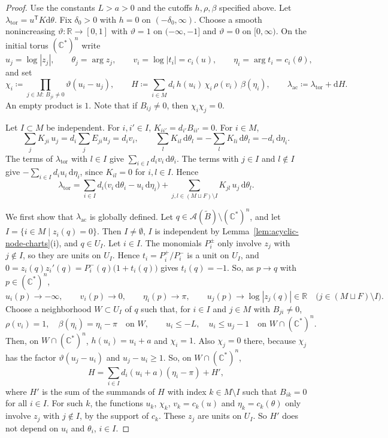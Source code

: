 \documentclass[11pt,a4paper]{article}
\newcommand{\cA}{\mathcal A}\newcommand{\sA}{\mathcal A}
\newcommand{\bC}{\mathbb C}\newcommand{\bR}{\mathbb R}\newcommand{\bZ}{\mathbb Z}
\newcommand{\dd}{\mathrm d}\newcommand{\T}{\mathsf T}
\newcommand{\ltor}{\lambda_{\mathrm{tor}}}
\begin{document}
\begin{proof}

Use the constants $L>a>0$ and the cutoffs $h,\rho,\beta$ specified above. Let \(\lambda_{\mathrm{tor}} = u^\T K \dd \theta \). 
Fix $\delta_0>0$ with $h=0$ on $(-\delta_0,\infty)$.
Choose a smooth nonincreasing $\vartheta\colon\bR\to[0,1]$ with $\vartheta=1$ on $(-\infty,-1]$ and $\vartheta=0$ on $[0,\infty)$.
On the initial torus $(\bC^*)^{n}$ write
\[
 u_j=\log|z_j|,\qquad \theta_j=\arg z_j,\qquad
 v_i=\log|t_i|=c_i(u),\qquad \eta_i=\arg t_i=c_i(\theta),
\]
and set
\[
 \chi_i \coloneqq \prod_{j\in M:\,B_{ji}\ne0}\vartheta(u_i-u_j),\qquad
 H \coloneqq \sum_{i\in M}d_i\,h(u_i)\,\chi_i\,\rho(v_i)\,\beta(\eta_i),\qquad
 \lambda_{\mathrm{ac}} \coloneqq\ltor+\dd H .
\]
An empty product is $1$. Note that 
if $B_{ij}\ne0$, then $\chi_i\chi_j=0$.


Let $I\subset M$ be independent.
For $i,i'\in I$, $K_{ii'}=d_{i'}B_{ii'}=0$.
For $i\in M$,
\[
 \sum_{j}K_{ji}\,u_j=d_i\sum_jE_{ji}u_j=d_iv_i,\qquad
 \sum_lK_{il}\,\dd\theta_l=-\sum_lK_{li}\,\dd\theta_l=-d_i\,\dd\eta_i .
\]
The terms of $\ltor$ with $l\in I$ give $\sum_{i\in I}d_iv_i\,\dd\theta_i$.
The terms with $j\in I$ and $l\notin I$ give $-\sum_{i\in I}d_iu_i\,\dd\eta_i$, since $K_{il}=0$ for $i,l\in I$.
Hence
\begin{equation}\label{eq:acyclic-ltor-split}
 \ltor=\sum_{i\in I}d_i\bigl(v_i\,\dd\theta_i-u_i\,\dd\eta_i\bigr)+\sum_{j,l\in(M\sqcup F)\setminus I}K_{jl}\,u_j\,\dd\theta_l .
\end{equation}

We first show that $\lambda_{\mathrm{ac}}$ is globally defined.
Let $q\in\cA(\widetilde B)\setminus(\bC^*)^{n}$, and let $I=\{i\in M\mid z_i(q)=0\}$.
Then $I\ne\emptyset$, $I$ is independent by Lemma~\ref{lem:acyclic-node-charts}(i), and $q\in U_I$.
Let $i\in I$.
The monomials $P_i^\pm$ only involve $z_j$ with $j\notin I$, so they are units on $U_I$.
Hence $t_i=P_i^+/P_i^-$ is a unit on $U_I$, and $0=z_i(q)z_i'(q)=P_i^-(q)\bigl(1+t_i(q)\bigr)$ gives $t_i(q)=-1$.
So, as $p\to q$ with $p\in(\bC^*)^{n}$,
\[
 u_i(p)\to-\infty,\qquad v_i(p)\to0,\qquad \eta_i(p)\to\pi,\qquad u_j(p)\to\log|z_j(q)|\in\bR\quad\bigl(j\in(M\sqcup F)\setminus I\bigr).
\]
Choose a neighborhood $W\subset U_I$ of $q$ such that, for $i\in I$ and $j\in M$ with $B_{ji}\ne0$,
\[
 \rho(v_i)=1,\quad \beta(\eta_i)=\eta_i-\pi\quad\text{on }W,\qquad
 u_i\le-L,\quad u_i\le u_j-1\quad\text{on }W\cap(\bC^*)^{n}.
\]
Then, on $W\cap(\bC^*)^{n}$, $h(u_i)=u_i+a$ and $\chi_i=1$.
Also $\chi_j=0$ there, because $\chi_j$ has the factor $\vartheta(u_j-u_i)$ and $u_j-u_i\ge1$.
So, on $W\cap(\bC^*)^{n}$,
\begin{equation}\label{eq:acyclic-H-near}
 H=\sum_{i\in I}d_i(u_i+a)(\eta_i-\pi)+H',
\end{equation}
where $H'$ is the sum of the summands of $H$ with index $k\in M\setminus I$ such that $B_{ik}=0$ for all $i\in I$.
For such $k$, the functions $u_k$, $\chi_k$, $v_k=c_k(u)$ and $\eta_k=c_k(\theta)$ only involve $z_j$ with $j\notin I$, by the support of $c_k$.
These $z_j$ are units on $U_I$.
So $H'$ does not depend on $u_i$ and $\theta_i$, $i\in I$.


\end{proof}
\end{document}
